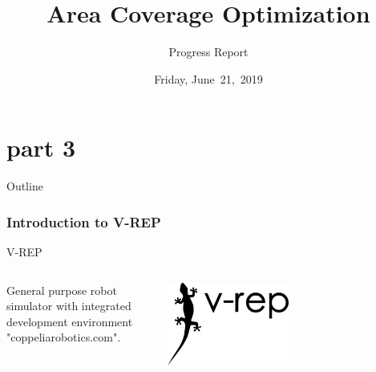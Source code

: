 \documentclass{beamer}
\begin{document}
\part{part 3}
\title{Area Coverage Optimization}
\subtitle{Progress Report}
\date[June~21,~2019]{Friday, June~21,~2019}
\begin{frame}
\maketitle
\end{frame}
\begin{frame}{Outline}
  \tableofcontents
\end{frame}
\section{Introduction to V-REP}
\begin{frame}{V-REP}
\begin{columns}
\begin{column}{0.5\textwidth}
General purpose robot simulator with integrated development environment "coppeliarobotics.com".
\end{column}
\begin{column}{0.5\textwidth}  %
    \begin{center}
     \includegraphics[width=0.5\textwidth]{figs/img/vrep.png}
     \end{center}
\end{column}
\end{columns}
\end{frame}
\end{document}
